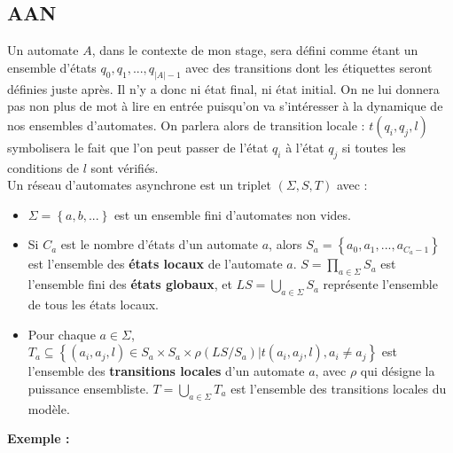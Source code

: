 \documentclass[12pt,a4paper]{article}
\begin{document}
\subsection{AAN}
Un automate $A$, dans le contexte de mon stage, sera défini comme étant un ensemble d'états $q_0, q_1, ..., q_{|A|-1}$ avec des transitions dont les étiquettes seront définies juste après. Il n'y a donc ni état final, ni état 
initial. On ne lui donnera pas non plus de mot à lire en entrée puisqu'on va s'intéresser à la dynamique de nos ensembles d'automates. On parlera alors de transition locale : $t(q_i,q_j,l)$ symbolisera le fait que l'on peut 
passer de l'état $q_i$ à l'état $q_j$ si toutes les conditions de $l$ sont vérifiés.\\
Un réseau d'automates asynchrone est un triplet $(\Sigma,S,T)$ avec :
\begin{itemize}
	\item $\Sigma=\left\{a,b,...\right\}$ est un ensemble fini d'automates non vides.
	\item Si $C_a$ est le nombre d'états d'un automate $a$, alors $S_a=\left\{a_0,a_1,...,a_{C_a-1}\right\}$ est l'ensemble des \textbf{états locaux} de l'automate $a$. $S=\displaystyle{\prod_{a\in\Sigma}}S_a$ est l'ensemble 
	fini des \textbf{états globaux}, et $LS=\displaystyle{\bigcup_{a\in\Sigma}}S_a$ représente l'ensemble de tous les états locaux.
	\item Pour chaque $a\in\Sigma$, $T_a\subseteq\left\{(a_i,a_j,l)\in S_a\times S_a\times\rho(LS/S_a)|t(a_i,a_j,l), a_i\neq a_j\right\}$ est l'ensemble des \textbf{transitions locales} d'un automate $a$, avec $\rho$ qui 
	désigne la puissance ensembliste. $T=\displaystyle{\bigcup_{a\in\Sigma}}T_a$ est l'ensemble des transitions locales du modèle.
\end{itemize}
\textbf{Exemple :}

\begin{center}
\end{center}
\end{document}
